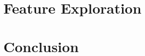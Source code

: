 \documentclass[journal, ]{IEEEtran}
\begin{document}
\section{Feature Exploration}

\section{Conclusion}

\ifCLASSOPTIONcaptionsoff
  \newpage
\fi




%
%


\end{document}
